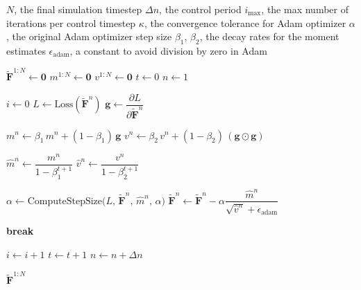    \begin{algorithm}
      \caption{Control Deformation Gradient Computation}\label{alg:mpm-morph}
      \begin{algorithmic}[1]
        \Require $N$, the final simulation timestep
        \Require $\Delta n$, the control period
        \Require $i_{\text{max}}$, the max number of iterations per control timestep
        \Require $\kappa$, the convergence tolerance for Adam optimizer
        \Require $\alpha$, the original Adam optimizer step size
        \Require $\beta_1$, $\beta_2$, the decay rates for the moment estimates
        \Require $\epsilon_{\text{adam}}$, a constant to avoid division by zero in Adam
    
        \State $\tilde{\mathbf{F}}^{1:N} \gets \mathbf{0}$ 
        \State $m^{1:N} \gets \mathbf{0}$ 
        \State $v^{1:N} \gets \mathbf{0}$ 
        \State $t \gets 0$
        \State $n \gets 1$
    
          \State $i \gets 0$
            \State $L \gets \text{Loss}(\tilde{\mathbf{F}}^{n})$ 
            \State $\mathbf{g} \gets \dfrac{\partial L}{\partial \tilde{\mathbf{F}}^{n}}$ 
    
            \State $m^{n} \gets \beta_1\, m^{n} + (1-\beta_1)\, \mathbf{g}$
            \State $v^{n} \gets \beta_2\, v^{n} + (1-\beta_2)\, (\mathbf{g} \odot \mathbf{g})$ 
    
            \State $\hat{m}^{n} \gets \dfrac{m^{n}}{1-\beta_1^{t+1}}$ 
            \State $\hat{v}^{n} \gets \dfrac{v^{n}}{1-\beta_2^{t+1}}$
    
            \State $\alpha \gets \text{ComputeStepSize}\big(L,\, \tilde{\mathbf{F}}^{n},\, \hat{m}^{n},\, \alpha\big)$
            \State $\tilde{\mathbf{F}}^{n} \gets \tilde{\mathbf{F}}^{n} - \alpha \dfrac{\hat{m}^{n}}{\sqrt{\hat{v}^{n}} + \epsilon_{\text{adam}}}$
    
              \State \textbf{break}
            \EndIf
    
            \State $i \gets i + 1$
            \State $t \gets t + 1$
          \EndWhile
          \State $n \gets n + \Delta n$
        \EndWhile
    
        \State \Return $\tilde{\mathbf{F}}^{1:N}$
      \end{algorithmic}
    \end{algorithm}


